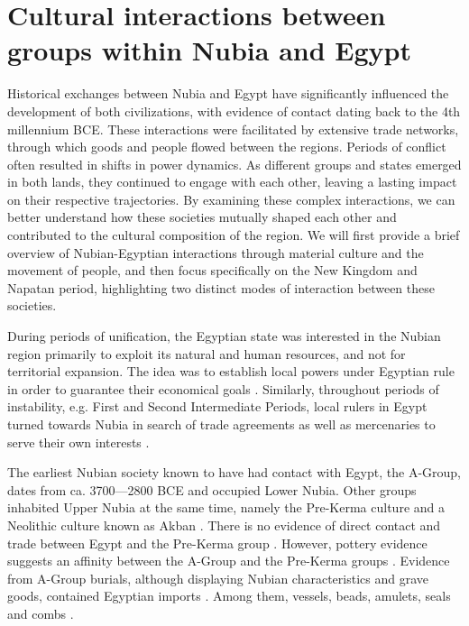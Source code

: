 \section{Cultural interactions between groups within Nubia and Egypt}

Historical exchanges between Nubia and Egypt have significantly influenced the development of both civilizations, with evidence of contact dating back to the 4th millennium BCE. These interactions were facilitated by extensive trade networks, through which goods and people flowed between the regions. Periods of conflict often resulted in shifts in power dynamics. As different groups and states emerged in both lands, they continued to engage with each other, leaving a lasting impact on their respective trajectories. By examining these complex interactions, we can better understand how these societies mutually shaped each other and contributed to the cultural composition of the region. We will first provide a brief overview of Nubian-Egyptian interactions through material culture and the movement of people, and then focus specifically on the New Kingdom and Napatan period, highlighting two distinct modes of interaction between these societies.

During periods of unification, the Egyptian state was interested in the Nubian region primarily to exploit its natural and human resources, and not for territorial expansion. The idea was to establish local powers under Egyptian rule in order to guarantee their economical goals \parencites[p.~94-95]{seidlmayerNubierImAgytischen2002}[p.~570]{Raue2019b}. Similarly, throughout periods of instability, e.g. First and Second Intermediate Periods, local rulers in Egypt turned towards Nubia in search of trade agreements as well as mercenaries to serve their own interests \parencite[p.~141]{naserStructuresRealitiesEgyptianNubian2013}.

The earliest Nubian society known to have had contact with Egypt, the A-Group, dates from ca. 3700—2800 BCE and occupied Lower Nubia. Other groups inhabited Upper Nubia at the same time, namely the Pre-Kerma culture and a Neolithic culture known as Akban \parencite[p.~127]{gattoAGroup4thMillennium2020}. There is no evidence of direct contact and trade between Egypt and the Pre-Kerma group \parencites[p.~148]{honeggerPreKermaCultureBeginning2020}[p.~110]{emberlingEarlyKushKingdom2022}. However, pottery evidence suggests an affinity between the A-Group and the Pre-Kerma groups \parencite[p.~222]{honeggerHolocenePrehistoryUpper2019a}. Evidence from A-Group burials, although displaying Nubian characteristics and grave goods, contained Egyptian imports \parencites{gattoNubianAGroupReassessment2006}[p.83]{williamsRelationsEgyptNubia2011}. Among them, vessels, beads, amulets, seals and combs \parencites[p.~35-36]{torokTwoWorldsFrontier2009}[p.~184-199]{royPoliticsTradeEgypt2011}.

